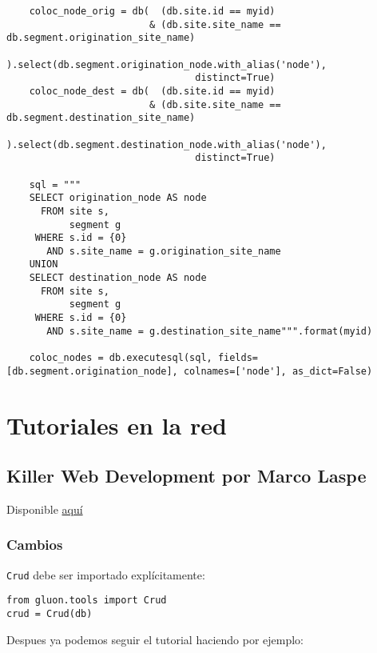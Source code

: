 \documentclass[12pt,spanish,]{article}
\begin{document}
\begin{verbatim}
    coloc_node_orig = db(  (db.site.id == myid)
                         & (db.site.site_name == db.segment.origination_site_name)
                        ).select(db.segment.origination_node.with_alias('node'),
                                 distinct=True)
    coloc_node_dest = db(  (db.site.id == myid)
                         & (db.site.site_name == db.segment.destination_site_name)
                        ).select(db.segment.destination_node.with_alias('node'),
                                 distinct=True)

    sql = """
    SELECT origination_node AS node
      FROM site s,
           segment g
     WHERE s.id = {0}
       AND s.site_name = g.origination_site_name
    UNION
    SELECT destination_node AS node
      FROM site s,
           segment g
     WHERE s.id = {0}
       AND s.site_name = g.destination_site_name""".format(myid)

    coloc_nodes = db.executesql(sql, fields=[db.segment.origination_node], colnames=['node'], as_dict=False)
\end{verbatim}

\hypertarget{tutoriales-en-la-red}{%
\section{Tutoriales en la red}\label{tutoriales-en-la-red}}

\hypertarget{killer-web-development-por-marco-laspe}{%
\subsection{Killer Web Development por Marco
Laspe}\label{killer-web-development-por-marco-laspe}}

Disponible \href{http://killer-web-development.com}{aquí}

\hypertarget{cambios}{%
\subsubsection{Cambios}\label{cambios}}

\texttt{Crud} debe ser importado explícitamente:

\begin{verbatim}
from gluon.tools import Crud
crud = Crud(db)
\end{verbatim}

Despues ya podemos seguir el tutorial haciendo por ejemplo:
\end{document}
